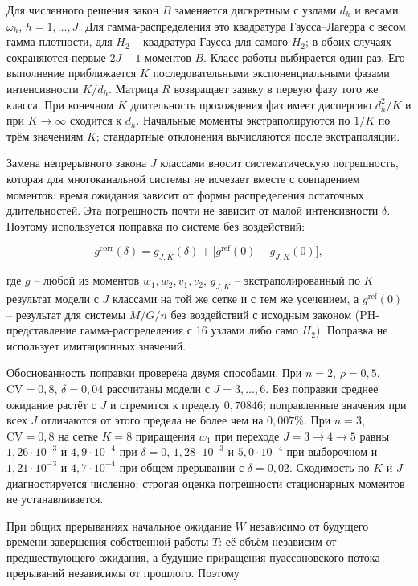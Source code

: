 Для численного решения закон \(B\) заменяется дискретным с узлами \(d_h\) и весами \(\omega_h\), \(h=1,\ldots,J\). Для гамма-распределения это квадратура Гаусса--Лагерра с весом гамма-плотности, для \(H_2\) -- квадратура Гаусса для самого \(H_2\); в обоих случаях сохраняются первые \(2J-1\) моментов \(B\). Класс работы выбирается один раз. Его выполнение приближается \(K\) последовательными экспоненциальными фазами интенсивности \(K/d_h\). Матрица \(R\) возвращает заявку в первую фазу того же класса. При конечном \(K\) длительность прохождения фаз имеет дисперсию \(d_h^2/K\) и при \(K\to\infty\) сходится к \(d_h\). Начальные моменты экстраполируются по \(1/K\) по трём значениям \(K\); стандартные отклонения вычисляются после экстраполяции.

Замена непрерывного закона \(J\) классами вносит систематическую погрешность, которая для многоканальной системы не исчезает вместе с совпадением моментов: время ожидания зависит от формы распределения остаточных длительностей. Эта погрешность почти не зависит от малой интенсивности \(\delta\). Поэтому используется поправка по системе без воздействий:


\[g^{\mathrm{corr}}(\delta)=g_{J,K}(\delta)+\bigl[g^{\mathrm{ref}}(0)-g_{J,K}(0)\bigr],\]


где \(g\) -- любой из моментов \(w_1,w_2,v_1,v_2\), \(g_{J,K}\) -- экстраполированный по \(K\) результат модели с \(J\) классами на той же сетке и с тем же усечением, а \(g^{\mathrm{ref}}(0)\) -- результат для системы \(M/G/n\) без воздействий с исходным законом (PH-представление гамма-распределения с 16 узлами либо само \(H_2\)). Поправка не использует имитационных значений.

Обоснованность поправки проверена двумя способами. При \(n=2\), \(\rho=0{,}5\), \(\mathrm{CV}=0{,}8\), \(\delta=0{,}04\) рассчитаны модели с \(J=3,\ldots,6\). Без поправки среднее ожидание растёт с \(J\) и стремится к пределу \(0{,}70846\); поправленные значения при всех \(J\) отличаются от этого предела не более чем на \(0{,}007\%\). При \(n=3\), \(\mathrm{CV}=0{,}8\) на сетке \(K=8\) приращения \(w_1\) при переходе \(J=3\to4\to5\) равны \(1{,}26\cdot10^{-3}\) и \(4{,}9\cdot10^{-4}\) при \(\delta=0\), \(1{,}28\cdot10^{-3}\) и \(5{,}0\cdot10^{-4}\) при выборочном и \(1{,}21\cdot10^{-3}\) и \(4{,}7\cdot10^{-4}\) при общем прерывании с \(\delta=0{,}02\). Сходимость по \(K\) и \(J\) диагностируется численно; строгая оценка погрешности стационарных моментов не устанавливается.

При общих прерываниях начальное ожидание \(W\) независимо от будущего времени завершения собственной работы \(T\): её объём независим от предшествующего ожидания, а будущие приращения пуассоновского потока прерываний независимы от прошлого. Поэтому


